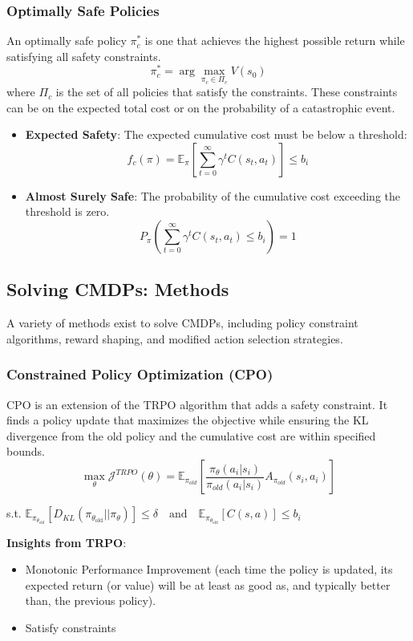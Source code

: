 \documentclass[12pt]{article}
\begin{document}
\subsubsection{Optimally Safe Policies}
An optimally safe policy $\pi_c^*$ is one that achieves the highest possible return while satisfying all safety constraints.
$$ \pi^*_c = \arg\max_{\pi_c \in \Pi_c} V(s_0) $$
where $\Pi_c$ is the set of all policies that satisfy the constraints. These constraints can be on the expected total cost or on the probability of a catastrophic event.
\begin{itemize}
    \item \textbf{Expected Safety}: The expected cumulative cost must be below a threshold:
    $$ f_c(\pi) = \mathbb{E}_\pi \left[ \sum_{t=0}^\infty \gamma^t C(s_t, a_t) \right] \leq b_i $$
    \item \textbf{Almost Surely Safe}: The probability of the cumulative cost exceeding the threshold is zero.
    $$ P_\pi \left( \sum_{t=0}^\infty \gamma^t C(s_t, a_t) \leq b_i \right) = 1 $$
\end{itemize}

\subsection{Solving CMDPs: Methods}
A variety of methods exist to solve CMDPs, including policy constraint algorithms, reward shaping, and modified action selection strategies.

\subsubsection{Constrained Policy Optimization (CPO)}
CPO is an extension of the TRPO algorithm that adds a safety constraint. It finds a policy update that maximizes the objective while ensuring the KL divergence from the old policy and the cumulative cost are within specified bounds.
$$
\max_{\theta} \mathcal{J}^{TRPO}(\theta) = \mathbb{E}_{\pi_{old}}\left[ \frac{\pi_{\theta}(a_i|s_i)}{\pi_{old}(a_i|s_i)}A_{\pi_{old}}(s_i, a_i) \right] 
$$
\begin{center}
s.t. $\mathbb{E}_{\pi_{\theta_{\text{old}}}} [D_{KL}(\pi_{\theta_{\text{old}}} || \pi_\theta)] \leq \delta \quad \text{and} \quad \mathbb{E}_{\pi_{\theta_{\text{old}}}} [C(s, a)] \leq b_i$
\end{center}

\textbf{Insights from TRPO}:
\begin{itemize}
    \item Monotonic Performance Improvement (each time the policy is updated, its expected return (or value) will be at least as good as, and typically better than, the previous policy).
    \item Satisfy constraints
\end{itemize}
\end{document}
